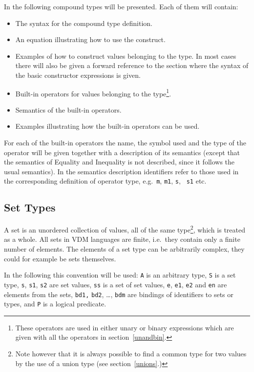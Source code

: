 \documentclass{overturerepchap}
\begin{document}
In the following compound types will be presented. Each of
them will contain:
\begin{itemize}
\item The syntax for the compound type definition.
\item An equation illustrating how to use the construct.
\item Examples of how to construct values belonging to the type. In
  most cases there will also be given a forward reference to the
  section where the syntax of the basic constructor expressions is given.
\item Built-in operators for values belonging to the
  type\footnote{These operators are used in either unary or binary
    expressions which are given with all the operators in
    section~\ref{unandbin}.}.
\item Semantics of the built-in operators.
\item Examples illustrating how the built-in operators can be used.
\end{itemize}
For each of the built-in operators the name, the symbol used and the
type of the operator will be given together with a description of its
semantics (except that the semantics of Equality and Inequality is not
described, since it follows the usual semantics). In the semantics
description identifiers refer to those used in the corresponding
definition of operator type, e.g.\ {\tt m}, {\tt m1}, {\tt s}, {\tt
  s1} etc.

\subsection{Set Types}
\label{sets}

A set is an unordered collection of values, all of the same
type\footnote{Note however that it is always possible to find a common
  type for two values by the use of a union type (see
  section~\ref{unions}.)}, which is treated as a whole. All sets in 
VDM languages are finite, i.e.\ they contain only a finite
number of elements. The elements of a set type can be arbitrarily
complex, they could for example be sets themselves.

In the following this convention will be used: {\tt A} is an arbitrary
type, {\tt S} is a set type, {\tt s}, {\tt s1}, {\tt s2} are set
values, {\tt ss} is a set of set values, {\tt e}, {\tt e1}, {\tt e2}
and {\tt en} are elements from the sets, {\tt bd1,} {\tt bd2}, \ldots,
{\tt bdm} are bindings of identifiers to sets or types, and {\tt P} is
a logical predicate.
\end{document}
